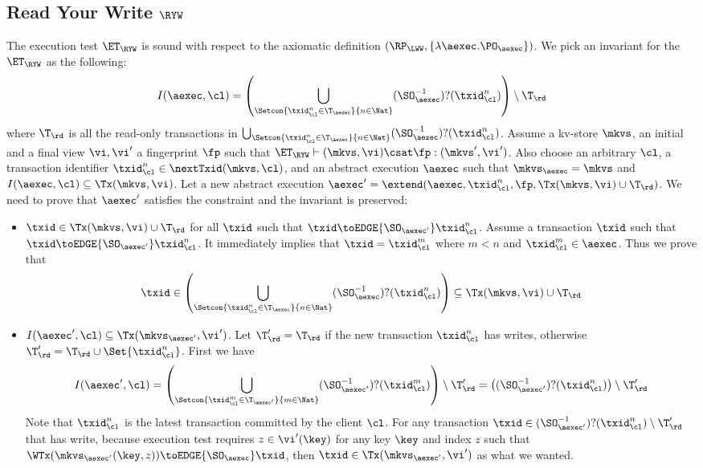 \subsection{Read Your Write \( \RYW \) }

\label{sec:sound-complete-ryw}

The execution test $\ET_\RYW$ is sound with respect to the axiomatic definition 
$(\RP_{\LWW}, \{\lambda \aexec. \PO_{\aexec} \})$.
We pick an invariant for the \( \ET_\RYW \) as the following:
\[
    I(\aexec, \cl) = \left( \bigcup_{\Setcon{\txid_{\cl}^{n} \in \T_{\aexec} }{ n \in \Nat }} (\SO_{\aexec}^{-1})?(\txid^n_\cl) \right) \setminus \T_\rd
\]
where \( \T_\rd \) is all the read-only transactions in \( \bigcup_{\Setcon{\txid_{\cl}^{n} \in \T_{\aexec} }{ n \in \Nat }} (\SO_{\aexec}^{-1})?(\txid^n_\cl) \).
Assume a kv-store $\mkvs$, an initial and a final view $\vi, \vi'$  a fingerprint $\fp$ 
such that $\ET_{\RYW} \vdash (\mkvs, \vi) \csat \fp: (\mkvs',\vi')$. 
Also choose an arbitrary $\cl$, a transaction identifier $\txid_\cl^n \in \nextTxid(\mkvs, \cl)$, 
and an abstract execution $\aexec$ such that $\mkvs_{\aexec} = \mkvs$ and 
\( I(\aexec, \cl) \subseteq \Tx(\mkvs, \vi) \).
Let a new abstract execution \( \aexec' = \extend(\aexec, \txid_\cl^n, \fp, \Tx(\mkvs, \vi) \cup \T_\rd) \).
We need to prove that \( \aexec' \) satisfies the constraint and the invariant is preserved:
\begin{itemize}
    \item \( \txid \in \Tx(\mkvs, \vi) \cup \T_\rd  \) for all \( \txid \) such that \( \txid \toEDGE{\SO_{\aexec'}} \txid_\cl^n  \). 
    Assume a transaction \( \txid \) such that \( \txid \toEDGE{\SO_{\aexec'}} \txid_\cl^n \).
It immediately implies that \( \txid = \txid_\cl^m\) where \( m < n \) and \( \txid_\cl^m \in \aexec \).
Thus we prove that 
\[ 
    \txid \in \left( \bigcup_{\Setcon{\txid_{\cl}^{n} \in \T_{\aexec} }{ n \in \Nat}} (\SO_{\aexec}^{-1})?(\txid^n_\cl) \right) \subseteq \Tx(\mkvs,\vi) \cup \T_\rd
\]
\item \(I(\aexec',\cl) \subseteq \Tx(\mkvs_{\aexec'}, \vi') \).
Let \( \T'_\rd = \T_\rd \) if the new transaction \( \txid_\cl^n\) has writes, otherwise \( \T'_\rd = \T_\rd \cup \Set{\txid_\cl^n}\).
First we have
\[ I(\aexec', \cl) = \left(\bigcup_{\Setcon{\txid_{\cl}^{m} \in \T_{\aexec'} }{ m \in \Nat }} (\SO_{\aexec'}^{-1})?(\txid^m_\cl) \right) \setminus \T'_{\rd} = \left( (\SO_{\aexec'}^{-1})?(\txid^n_\cl) \right) \setminus \T'_\rd 
\]
Note that \( \txid^n_\cl \) is the latest transaction committed by the client \( \cl \).
For any transaction \( \txid \in (\SO_{\aexec'}^{-1})?(\txid^n_\cl) \setminus \T'_\rd \) that has write,
because execution test requires \( z \in \vi'(\key) \) for any key \( \key \) and index \( z \) such that \( \WTx( \mkvs_{\aexec'}(\key, z) ) \toEDGE{\SO_\aexec} \txid \),
then \( \txid \in \Tx(\mkvs_{\aexec'}, \vi') \) as what we wanted.
\end{itemize}

